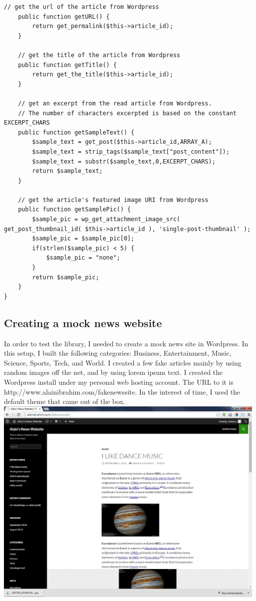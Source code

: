 \documentclass[12pt]{article}
\begin{document}
\begin{enumerate}
\begin{lstlisting}[basicstyle=\scriptsize]
	// get the url of the article from Wordpress
	public function getURL() {
		return get_permalink($this->article_id);		
	}
	
	// get the title of the article from Wordpress
	public function getTitle() {
		return get_the_title($this->article_id);		
	}
	
	// get an excerpt from the read article from Wordpress. 
	// The number of characters excerpted is based on the constant EXCERPT_CHARS
	public function getSampleText() {
		$sample_text = get_post($this->article_id,ARRAY_A);
		$sample_text = strip_tags($sample_text["post_content"]);
		$sample_text = substr($sample_text,0,EXCERPT_CHARS);
		return $sample_text;
	}
	
	// get the article's featured image URI from Wordpress
	public function getSamplePic() {
		$sample_pic = wp_get_attachment_image_src( get_post_thumbnail_id( $this->article_id ), 'single-post-thumbnail' );
		$sample_pic = $sample_pic[0];
		if(strlen($sample_pic) < 5) {
			$sample_pic = "none";
		}
		return $sample_pic;
	}
}
\end{lstlisting}
\end{enumerate}
\subsection{Creating a mock news website}
In order to test the library, I needed to create a mock news site in Wordpress. In this setup, I built the following categories: Business, Entertainment, Music, Science, Sports, Tech, and World. I created a few fake articles mainly by using random images off the net, and by using lorem ipsum text. I created the Wordpress install under my personal web hosting account. The URL to it is http://www.alainibrahim.com/fakenewssite. In the interest of time, I used the default theme that came out of the box. \\

\noindent\includegraphics[scale=0.5]{img/fakenewssite_main} 
\end{document}
